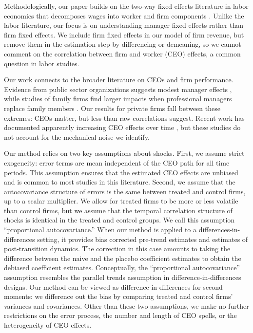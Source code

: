 \documentclass[11pt,a4paper]{article}
\begin{document}
Methodologically, our paper builds on the two-way fixed effects literature in labor economics that decomposes wages into worker and firm components \citep{Abowd1999Econometrica, Card2018JoLE}. Unlike the labor literature, our focus is on understanding manager fixed effects rather than firm fixed effects. We include firm fixed effects in our model of firm revenue, but remove them in the estimation step by differencing or demeaning, so we cannot comment on the correlation between firm and worker (CEO) effects, a common question in labor studies.

Our work connects to the broader literature on CEOs and firm performance. Evidence from public sector organizations suggests modest manager effects \citep{fenizia2022managers, janke2024role}, while studies of family firms find larger impacts when professional managers replace family members \citep{bennedsen2007inside, sraer2007performance}. Our results for private firms fall between these extremes: CEOs matter, but less than raw correlations suggest. Recent work has documented apparently increasing CEO effects over time \citep{quigley2015has}, but these studies do not account for the mechanical noise we identify. 


Our method relies on two key assumptions about shocks. First, we assume strict exogeneity: error terms are mean independent of the CEO path for all time periods. This assumption ensures that the estimated CEO effects are unbiased and is common to most studies in this literature. Second, we assume that the autocovariance structure of errors is the same between treated and control firms, up to a scalar multiplier. We allow for treated firms to be more or less volatile than control firms, but we assume that the temporal correlation structure of shocks is identical in the treated and control groups. We call this assumption ``proportional autocovariance.'' When our method is applied to a differences-in-differences setting, it  provides bias corrected pre-trend estimates and estimates of post-transition dynamics. The correction in this case amounts to taking the difference between the naive and the placebo coefficient estimates to obtain the debiased coefficient estimates. Conceptually, the ``proportional autocovariance'' assumption resembles the parallel trends assumption in difference-in-differences designs. Our method can be viewed as difference-in-differences for second moments: we difference out the bias by comparing treated and control firms' variances and covariances. Other than these two assumptions, we make no further restrictions on the error process, the number and length of CEO spells, or the heterogeneity of CEO effects.
\end{document}

